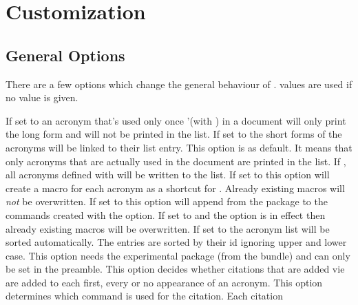 \documentclass[DIV10,toc=index,toc=bib,hyperfootnotes=false]{cnpkgdoc}
\makeatletter
\newcommand*\sinceversion[1]{%
  \@bsphack
  \marginnote{%
    \footnotesize\sffamily\RaggedRight
    \textcolor{black!75}{Introduced in version~#1}}%
  \@esphack}
\makeatother
\begin{document}
\section{Customization}\label{sec:customization}
\subsection{General Options}
There are a few options which change the general behaviour of \acro.
 values are used if no value is given.
\begin{beschreibung}
   If set to  an acronym that's used only once '(with ) in a
   document will only print the long form and will not be printed in the list.
   If set to  the short forms of the acronyms will be linked to their
   list entry.
   This option is  as default. It means that only acronyms that are
   actually used in the document are printed in the list. If , all
   acronyms defined with  will be written to the list.
   If set to  this option will create a macro  for each
   acronym as a shortcut for .  Already existing macros will
   \emph{not} be overwritten.
   \sinceversion{0.6}If set to  this option will append 
   from the  package to the commands created with the 
   option.
   If set to  and the option  is in effect then
   already existing macros will be overwritten.
   If set to  the acronym list will be sorted automatically. The
   entries are sorted by their \acs{id} ignoring upper and lower case. This
   option needs the experimental package  (from the
    bundle) and can only be set in the preamble.
   This option decides whether citations that are added vie 
   are added to each first, every or no appearance of an acronym.
   This option determines which command is used for the citation. Each citation

\end{beschreibung}
\end{document}

